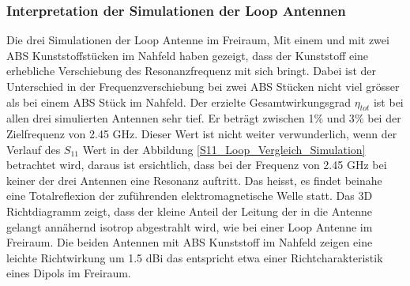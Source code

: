 \subsubsection{Interpretation der Simulationen der Loop Antennen}
Die drei Simulationen der Loop Antenne im Freiraum, Mit einem und mit zwei ABS Kunststoffstücken im Nahfeld haben gezeigt, dass der Kunststoff eine erhebliche Verschiebung des Resonanzfrequenz mit sich bringt. Dabei ist der Unterschied in der Frequenzverschiebung bei zwei ABS Stücken nicht viel grösser als bei einem ABS Stück im Nahfeld. Der erzielte Gesamtwirkungsgrad $\eta_{tot}$ ist bei allen drei simulierten Antennen sehr tief. Er beträgt zwischen 1$\%$ und 3$\%$ bei der Zielfrequenz von 2.45 GHz.
Dieser Wert ist nicht weiter verwunderlich, wenn der Verlauf des $S_{11}$ Wert in der Abbildung \ref{S11_Loop_Vergleich_Simulation} betrachtet wird, daraus ist ersichtlich, dass bei der Frequenz von 2.45 GHz bei keiner der drei Antennen eine Resonanz auftritt. Das heisst, es findet beinahe eine Totalreflexion der zuführenden elektromagnetische Welle statt. Das 3D Richtdiagramm zeigt, dass der kleine Anteil der Leitung der in die Antenne gelangt annähernd isotrop abgestrahlt wird, wie bei einer Loop Antenne im Freiraum. Die beiden Antennen  mit ABS Kunststoff im Nahfeld zeigen eine leichte Richtwirkung um 1.5 dBi das entspricht etwa einer Richtcharakteristik eines Dipols im Freiraum.


\newpage
